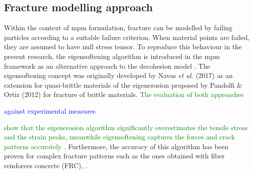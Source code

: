 \documentclass[preprint,12pt,a4paper]{elsarticle}
\newcommand{\MMP}[1]{
  \textcolor{blue}{{#1}}
}
\newcommand{\DM}[1]{
  \textcolor{green}{{#1}}
}
\begin{document}
\subsection{Fracture modelling approach}
\label{sec:2.3}
Within the context of \acrshort{mpm} formulation, fracture can be
modelled by failing particles according to a suitable failure
criterion. When material points are failed, they are assumed to have
null stress tensor. To reproduce this behaviour in the present
research, the eigensoftening algorithm is introduced in the 
\acrshort{mpm} framework as an alternative approach to the decohesion
model \cite{Zhenmao_2005,Schreyer_2002}. The eigensoftening concept
was originally developed by Navas {\it et al.}
(2017)\cite{Navas_2017_ES} as an extension for quasi-brittle materials
of the eigenerosion proposed by Pandolfi \& Ortiz
(2012)\cite{Pandolfi_2012} for fracture of brittle materials.\DM{The
  evaluation of both approaches \cite{Navas_2017_ES}}\MMP{against
  experimental measures}\DM{show that the eigenerosion algorithm significantly overestimates the tensile stress and the strain peaks, meanwhile eigensoftening captures the forces and crack
patterns accurately}. Furthermore,
the accuracy of this algorithm has been proven for complex fracture
patterns such as the ones obtained with fiber reinforces concrete (FRC),
\cite{Navas_2018_ES}.\\
\end{document}
